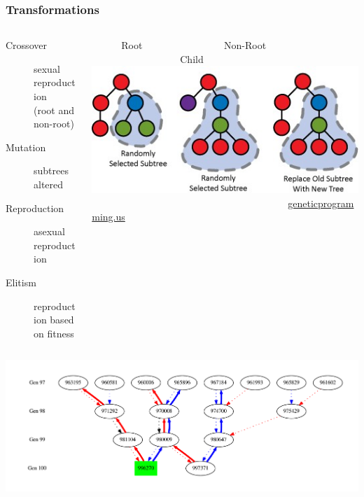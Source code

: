\documentclass{beamer}
\begin{document}
\begin{frame}
\frametitle{Transformations}
\begin{columns}
\begin{column}{0.55\textwidth}
{\footnotesize
		\begin{description}
		\item[Crossover] sexual reproduction \\ (root and non-root)
		\item[Mutation] subtrees altered
		\item[Reproduction] asexual reproduction
		\item[Elitism] reproduction based on fitness
		\end{description}
}
\end{column}
\begin{column}{0.45\textwidth}
{\tiny \ \ \ \ \ \ Root \ \ \ \ \ \ \ \ \ \ \ \ \ \ \ \ Non-Root \ \ \ \ \ \ \ \ \ \ \ \ \ \ \ \ \ \ Child}
\includegraphics[width=.95\textwidth]{subtreeCrossover.jpg} \\
{\tiny \ \ \ \ \ \ \ \ \ \ \ \ \ \ \ \ \ \ \ \ \ \ \ \ \ \ \ \ \ \ \ \ \ \ \ \ \ \ \ \ \url{geneticprogramming.us}}
\end{column}
\end{columns}
\begin{center}
\includegraphics[width=.95\textwidth]{XO_path_example.pdf}
\end{center}
\end{frame}
\end{document}
